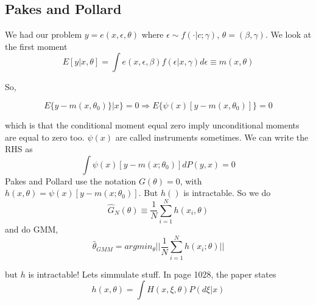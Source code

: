 \documentclass[12pt]{article}
\begin{document}
	\subsection{Pakes and Pollard}

	We had our problem $y=e(x,\epsilon, \theta)$ where $\epsilon \sim f(\cdot | c; \gamma ) $, $\theta = (\beta , \gamma)$. We look at the first moment
	\begin{equation}
		E[y | x, \theta] = \int e(x, \epsilon, \beta) f(\epsilon | x, \gamma) d \epsilon \equiv m(x, \theta)
	\end{equation}

	So,

	\begin{equation}
		E \{ y - m(x, \theta_0 )\} | x \} = 0 \Rightarrow E\{ \psi(x) [y - m(x, \theta_0 )] \} = 0
	\end{equation}

	which is that the conditional moment equal zero imply unconditional moments are equal to zero too. $\psi(x)$ are called instruments sometimes. We can write the RHS as
	\begin{equation}
		\int \psi(x) [y - m(x; \theta_0)] dP(y,x) = 0
	\end{equation}
	 Pakes and Pollard use the notation $G(\theta) = 0$, with $h(x,\theta) = \psi(x) [y - m(x; \theta_0)]$. But $h()$ is intractable. So we do
	 \begin{equation}
	 	\hat{G}_N(\theta) \equiv \frac{1}{N} \sum^N_{i=1} h(x_i, \theta)
	 \end{equation}
	 and do GMM,
	 \begin{equation}
	 	\hat{\theta}_{GMM} = argmin_{\theta} || \frac{1}{N} \sum^N_{i = 1} h(x_i; \theta) ||
	 \end{equation}

	 but $h$ is intractable! Lets simmulate stuff. In page 1028, the paper states
	 \begin{equation}
	 	h(x,\theta) = \int H(x, \xi, \theta ) P(d \xi | x)
	 \end{equation}
\end{document}
